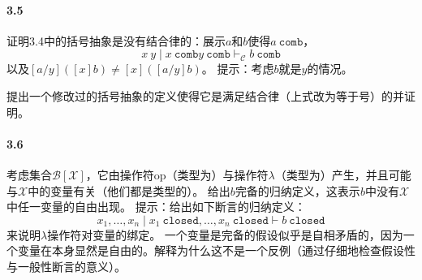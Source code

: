 \paragraph{3.5}
证明3.4中的括号抽象是没有结合律的：展示$a$和$b$使得$a \ \mathtt{comb}$，
$$x \ y \mid x \ \mathtt{comb} y \ \mathtt{comb} \vdash_{\mathcal{C}} b \ \mathtt{comb} $$
以及$[a/y]([x]b) \neq [x] ([a / y]b)$。
提示：考虑$b$就是$y$的情况。

提出一个修改过的括号抽象的定义使得它是满足结合律（上式改为等于号）的并证明。

\paragraph{3.6}
考虑集合$\mathcal{B}[\mathcal{X}]$，它由操作符op（类型为）与操作符$\lambda$（类型为）产生，并且可能与$\mathcal{X}$中的变量有关（他们都是类型的）。
给出$b$完备的归纳定义，这表示$b$中没有$\mathcal{X}$中任一变量的自由出现。
提示：给出如下断言的归纳定义：
$$x_1,\dots,x_n \mid x_1 \ \mathtt{closed}, \dots , x_n \ \mathtt{closed} \vdash b \ \mathtt{closed} $$
来说明$\lambda$操作符对变量的绑定。
一个变量是完备的假设似乎是自相矛盾的，因为一个变量在本身显然是自由的。解释为什么这不是一个反例（通过仔细地检查假设性与一般性断言的意义）。
